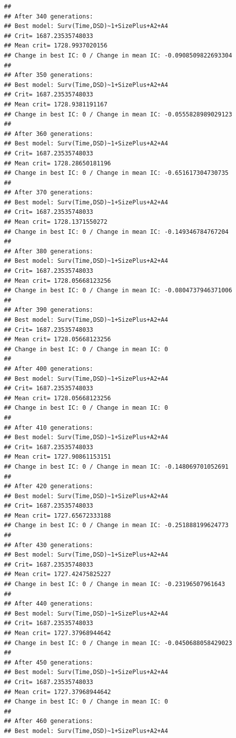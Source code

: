 \documentclass{article}\usepackage[]{graphicx}\usepackage[]{color}
\makeatletter
\newenvironment{kframe}{%
 \def\at@end@of@kframe{}%
 \ifinner\ifhmode%
  \def\at@end@of@kframe{\end{minipage}}%
  \begin{minipage}{\columnwidth}%
 \fi\fi%
 \def\FrameCommand##1{\hskip\@totalleftmargin \hskip-\fboxsep
 \colorbox{shadecolor}{##1}\hskip-\fboxsep
     \hskip-\linewidth \hskip-\@totalleftmargin \hskip\columnwidth}%
 \MakeFramed {\advance\hsize-\width
   \@totalleftmargin\z@ \linewidth\hsize
   \@setminipage}}%
 {\par\unskip\endMakeFramed%
 \at@end@of@kframe}
\newenvironment{knitrout}{}{} %
\makeatother
\begin{document}
\begin{knitrout}
\begin{kframe}
{\ttfamily\noindent\color{warningcolor}{\#\# Warning in fitter(X, Y, strats, offset, init, control, weights = weights, : Loglik converged before variable\ \ 17 ; beta may be infinite.}}\begin{verbatim}
## 
## After 340 generations:
## Best model: Surv(Time,DSD)~1+SizePlus+A2+A4
## Crit= 1687.23535748033
## Mean crit= 1728.9937020156
## Change in best IC: 0 / Change in mean IC: -0.0908509822693304
## 
## After 350 generations:
## Best model: Surv(Time,DSD)~1+SizePlus+A2+A4
## Crit= 1687.23535748033
## Mean crit= 1728.9381191167
## Change in best IC: 0 / Change in mean IC: -0.0555828989029123
## 
## After 360 generations:
## Best model: Surv(Time,DSD)~1+SizePlus+A2+A4
## Crit= 1687.23535748033
## Mean crit= 1728.28650181196
## Change in best IC: 0 / Change in mean IC: -0.651617304730735
## 
## After 370 generations:
## Best model: Surv(Time,DSD)~1+SizePlus+A2+A4
## Crit= 1687.23535748033
## Mean crit= 1728.1371550272
## Change in best IC: 0 / Change in mean IC: -0.149346784767204
## 
## After 380 generations:
## Best model: Surv(Time,DSD)~1+SizePlus+A2+A4
## Crit= 1687.23535748033
## Mean crit= 1728.05668123256
## Change in best IC: 0 / Change in mean IC: -0.0804737946371006
## 
## After 390 generations:
## Best model: Surv(Time,DSD)~1+SizePlus+A2+A4
## Crit= 1687.23535748033
## Mean crit= 1728.05668123256
## Change in best IC: 0 / Change in mean IC: 0
## 
## After 400 generations:
## Best model: Surv(Time,DSD)~1+SizePlus+A2+A4
## Crit= 1687.23535748033
## Mean crit= 1728.05668123256
## Change in best IC: 0 / Change in mean IC: 0
## 
## After 410 generations:
## Best model: Surv(Time,DSD)~1+SizePlus+A2+A4
## Crit= 1687.23535748033
## Mean crit= 1727.90861153151
## Change in best IC: 0 / Change in mean IC: -0.148069701052691
## 
## After 420 generations:
## Best model: Surv(Time,DSD)~1+SizePlus+A2+A4
## Crit= 1687.23535748033
## Mean crit= 1727.65672333188
## Change in best IC: 0 / Change in mean IC: -0.251888199624773
## 
## After 430 generations:
## Best model: Surv(Time,DSD)~1+SizePlus+A2+A4
## Crit= 1687.23535748033
## Mean crit= 1727.42475825227
## Change in best IC: 0 / Change in mean IC: -0.23196507961643
## 
## After 440 generations:
## Best model: Surv(Time,DSD)~1+SizePlus+A2+A4
## Crit= 1687.23535748033
## Mean crit= 1727.37968944642
## Change in best IC: 0 / Change in mean IC: -0.0450688058429023
## 
## After 450 generations:
## Best model: Surv(Time,DSD)~1+SizePlus+A2+A4
## Crit= 1687.23535748033
## Mean crit= 1727.37968944642
## Change in best IC: 0 / Change in mean IC: 0
## 
## After 460 generations:
## Best model: Surv(Time,DSD)~1+SizePlus+A2+A4

\end{verbatim}
\end{kframe}
\end{knitrout}
\end{document}
